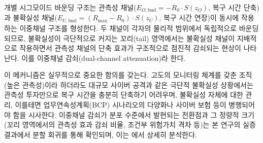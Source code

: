 개별 시그모이드 바운딩 구조는 관측성 채널($E_{O,\text{bnd}} = -R_0 \cdot S(z_O)$,
복구 시간 단축)과 불확실성 채널($E_{U,\text{bnd}} = (R_{\max}-R_0) \cdot S(z_U)$,
복구 시간 연장)이 동시에 작용하는 이중채널 구조를 형성한다. 두 채널이 각자의 물리적
범위에서 독립적으로 바운딩되므로, 불확실성이 극단적으로 커지는 꼬리(tail) 영역에서는
불확실성 채널이 지배적으로 작용하면서 관측성 채널의 단축 효과가 구조적으로 점진적 감쇠되는
현상이 나타난다. 이를 이중채널 감쇠(dual-channel attenuation)라 한다.

이 메커니즘은 실무적으로 중요한 함의를 갖는다. 고도의 모니터링 체계를 갖춘
조직(높은 관측성)이라 하더라도 대규모 사이버 공격과 같은 극단적 불확실성 상황에서는
관측성 투자만으로 복구 시간을 충분히 단축하기 어려우며, 불확실성 자체에 대한 관리,
이를테면 업무연속성계획(BCP) 시나리오의 다양화나 사이버 보험 등이 병행되어야 함을
시사한다. 이중채널 감쇠가 분포 수준에서 발현되는 전환점과 그 정량적 크기(꼬리
영역에서의 관측성 효과 감쇠 비율, 조건부 위험가치 격차 등)는 본 연구의 실증 결과에서
분할 회귀를 통해 확인되며, 이는 에서 상세히 분석한다.

